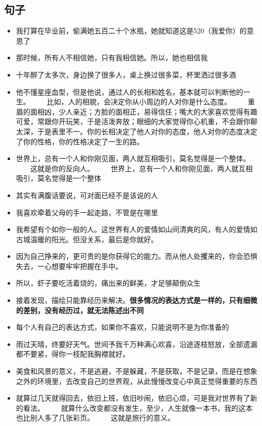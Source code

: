 \documentclass[UTF8,a4paper,8pt]{ctexbook}
\begin{document}
			\subsection{句子}
				\begin{itemize}
					\item 我打算在毕业前，偷满她五百二十个水瓶，她就知道这是520（我爱你）的意思了
					\item 那时候，所有人不相信她，只有我相信她。所以，她也相信我
					\item 十年醉了太多次，身边换了很多人，桌上换过很多菜，杯里洒过很多酒
					\item 他不懂星座血型，但是他说，通过人的长相和姓名，基本就可以判断他的一生。 　　比如，人的相貌，会决定你从小周边的人对你是什么态度。 　　重眉的面相凶，少人亲近；方脸的面相正，易得信任；嘴大的大家喜欢觉得有趣可爱，常跟你开玩笑，于是活泼奔放；眼细的大家觉得你心机重，不会跟你聊太深，于是表里不一。你的长相决定了他人对你的态度，他人对你的态度决定了你的性格，你的性格决定了一生的路。
					\item 世界上，总有一个人和你刚见面，两人就互相吸引，莫名觉得是一个整体。 　　这就是你的反向人。 　　世界上，总有一个人和你刚见面，两人就互相吸引，莫名觉得是一个整体
					\item 其实有满腹话要说，可对面已经不是该说的人
					\item 我喜欢牵着父母的手一起走路，不管是在哪里
					\item 我希望有个如你一般的人。这世界有人的爱情如山间清爽的风，有人的爱情如古城温暖的阳光。但没关系，最后是你就好。
					\item 因为自己挣来的，更可贵的是你获得它的能力。而从他人处攫来的，你会恐惧失去，一心想要牢牢把握在手中。
					\item 所以，虾子要吃活着烧的，痛出来的鲜美，才足够颠倒众生
					\item 接着发现，描绘只能靠经历来解决。\textbf{很多情况的表达方式是一样的，只有细微的差别，没有经历过，就无法陈述出不同}
					\item 每个人有自己的表达方式，如果你不喜欢，只能说明不是为你准备的
					\item 雨过天晴，终要好天气。世间予我千万种满心欢喜，沿途逐枝怒放，全部遗漏都不要紧，得你一枝配我胸襟就好。
					\item 美食和风景的意义，不是逃避，不是躲藏，不是获取，不是记录，而是在想象之外的环境里，去改变自己的世界观，从此慢慢改变心中真正觉得重要的东西
					\item 就算过几天就得回去，依旧上班，依旧吵闹，依旧心烦，可是我对世界有了新的看法。 　　就算什么改变都没有发生，至少，人生就像一本书，我的这本也比别人多了几张彩页。 　　这就是旅行的意义。

\end{itemize}
\end{document}
